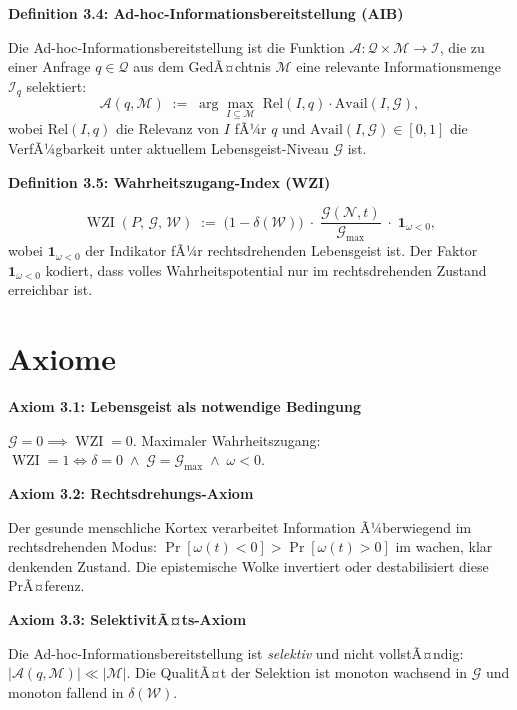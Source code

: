 ﻿\documentclass[12pt,a4paper]{report}
\theoremstyle{plain}
\theoremstyle{definition}
\theoremstyle{remark}
\DeclareMathOperator{\WZI}{WZI}
\begin{document}
	
	
	\noindent\textbf{Definition 3.4: Ad-hoc-Informationsbereitstellung (AIB)}

		\label{def:aib}
		Die Ad-hoc-Informationsbereitstellung ist die Funktion
		$\mathcal{A}: \mathcal{Q} \times \mathcal{M} \to \mathcal{I}$,
		die zu einer Anfrage $q \in \mathcal{Q}$ aus dem GedÃ¤chtnis $\mathcal{M}$
		eine relevante Informationsmenge $\mathcal{I}_{q}$ selektiert:
		\[
		\mathcal{A}(q, \mathcal{M})
		\;:=\;
		\arg\max_{I \subseteq \mathcal{M}}
		\;\mathrm{Rel}(I, q) \cdot \mathrm{Avail}(I, \mathcal{G}),
		\]
		wobei $\mathrm{Rel}(I,q)$ die Relevanz von $I$ fÃ¼r $q$
		und $\mathrm{Avail}(I, \mathcal{G}) \in [0,1]$ die VerfÃ¼gbarkeit
		unter aktuellem Lebensgeist-Niveau $\mathcal{G}$ ist.

	
	
	\noindent\textbf{Definition 3.5: Wahrheitszugang-Index (WZI)}

		\[
		\WZI(P,\,\mathcal{G},\,\mathcal{W})
		\;:=\;
		\bigl(1 - \delta(\mathcal{W})\bigr)
		\;\cdot\;
		\frac{\mathcal{G}(\mathcal{N},t)}{\mathcal{G}_{\max}}
		\;\cdot\;
		\mathbf{1}_{\omega < 0},
		\]
		wobei $\mathbf{1}_{\omega < 0}$ der Indikator fÃ¼r rechtsdrehenden
		Lebensgeist ist. Der Faktor $\mathbf{1}_{\omega < 0}$ kodiert, dass
		volles Wahrheitspotential nur im rechtsdrehenden Zustand erreichbar ist.

	
	\section{Axiome}
	
	
	\noindent\textbf{Axiom 3.1: Lebensgeist als notwendige Bedingung}

		$\mathcal{G} = 0 \implies \WZI = 0$.
		Maximaler Wahrheitszugang:
		$\WZI = 1 \iff \delta = 0 \;\wedge\; \mathcal{G} = \mathcal{G}_{\max}
		\;\wedge\; \omega < 0$.

	
	
	\noindent\textbf{Axiom 3.2: Rechtsdrehungs-Axiom}

		Der gesunde menschliche Kortex verarbeitet Information Ã¼berwiegend
		im rechtsdrehenden Modus: $\Pr[\omega(t) < 0] > \Pr[\omega(t) > 0]$
		im wachen, klar denkenden Zustand.
		Die epistemische Wolke invertiert oder destabilisiert diese PrÃ¤ferenz.

	
	
	\noindent\textbf{Axiom 3.3: SelektivitÃ¤ts-Axiom}

		Die Ad-hoc-Informationsbereitstellung ist \emph{selektiv} und nicht
		vollstÃ¤ndig: $|\mathcal{A}(q,\mathcal{M})| \ll |\mathcal{M}|$.
		Die QualitÃ¤t der Selektion ist monoton wachsend in $\mathcal{G}$
		und monoton fallend in $\delta(\mathcal{W})$.
\end{document}
